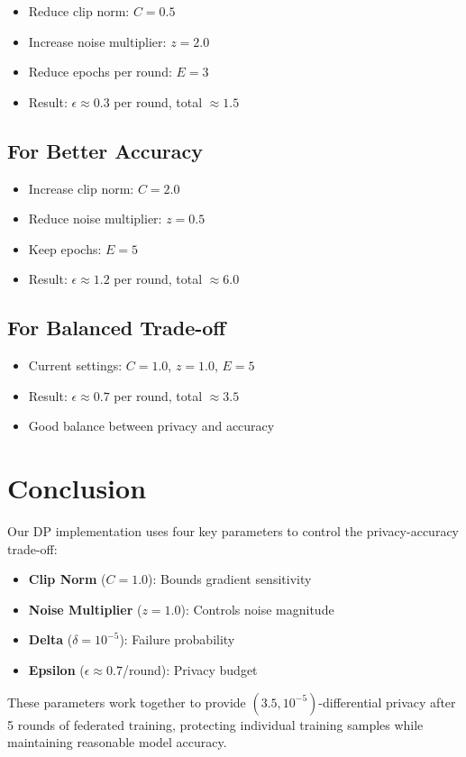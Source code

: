 \documentclass[12pt,a4paper]{article}
\begin{document}
\begin{itemize}
    \item Reduce clip norm: $C = 0.5$
    \item Increase noise multiplier: $z = 2.0$
    \item Reduce epochs per round: $E = 3$
    \item Result: $\epsilon \approx 0.3$ per round, total $\approx 1.5$
\end{itemize}

\subsection{For Better Accuracy}

\begin{itemize}
    \item Increase clip norm: $C = 2.0$
    \item Reduce noise multiplier: $z = 0.5$
    \item Keep epochs: $E = 5$
    \item Result: $\epsilon \approx 1.2$ per round, total $\approx 6.0$
\end{itemize}

\subsection{For Balanced Trade-off}

\begin{itemize}
    \item Current settings: $C = 1.0$, $z = 1.0$, $E = 5$
    \item Result: $\epsilon \approx 0.7$ per round, total $\approx 3.5$
    \item Good balance between privacy and accuracy
\end{itemize}

\section{Conclusion}

Our DP implementation uses four key parameters to control the privacy-accuracy trade-off:

\begin{itemize}
    \item \textbf{Clip Norm} ($C = 1.0$): Bounds gradient sensitivity
    \item \textbf{Noise Multiplier} ($z = 1.0$): Controls noise magnitude
    \item \textbf{Delta} ($\delta = 10^{-5}$): Failure probability
    \item \textbf{Epsilon} ($\epsilon \approx 0.7$/round): Privacy budget
\end{itemize}

These parameters work together to provide $(3.5, 10^{-5})$-differential privacy after 5 rounds of federated training, protecting individual training samples while maintaining reasonable model accuracy.
\end{document}
